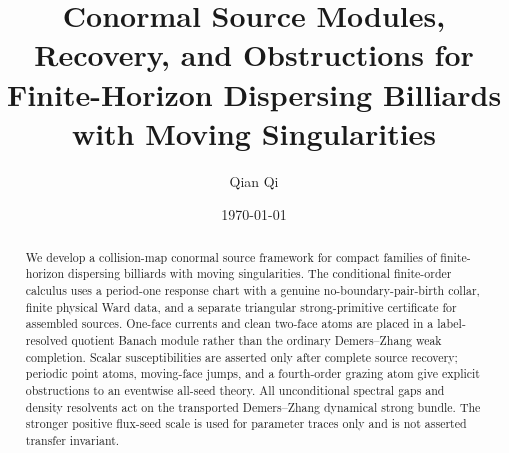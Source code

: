 \documentclass[11pt]{amsart}
\title[Conormal Sources for Moving-Singularity Billiards]{Conormal Source Modules, Recovery, and Obstructions for Finite-Horizon Dispersing Billiards with Moving Singularities}
\author{Qian Qi}
\date{\today}
\theoremstyle{compactplain}
\theoremstyle{compactdefinition}
\theoremstyle{compactremark}
\begin{document}
\begin{abstract}
We develop a collision-map conormal source framework for compact
families of finite-horizon dispersing billiards with moving singularities.
The conditional finite-order calculus uses a period-one response chart with a genuine
no-boundary-pair-birth collar, finite physical Ward data, and a separate
triangular strong-primitive certificate for assembled sources.  One-face
currents and clean two-face atoms are placed in a label-resolved quotient
Banach module rather than the ordinary Demers--Zhang weak completion.  Scalar
susceptibilities are asserted only after complete source recovery; periodic
point atoms, moving-face jumps, and a fourth-order grazing atom give explicit
obstructions to an eventwise all-seed theory.
All unconditional spectral gaps and density resolvents act on the transported
Demers--Zhang dynamical strong bundle.  The stronger positive flux-seed scale
is used for parameter traces only and is not asserted transfer invariant.


\end{abstract}
\end{document}
